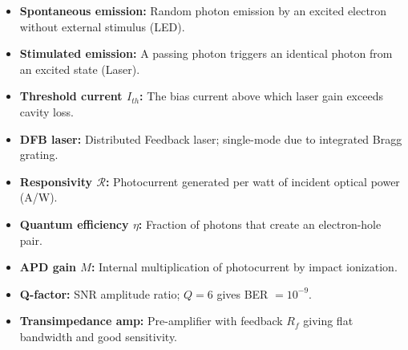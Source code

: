 \documentclass[12pt,a4paper]{article}
\begin{document}
\begin{tcolorbox}[defbox, title={\textbf{One-Line Definitions}}]
\begin{itemize}[leftmargin=*, itemsep=2pt, topsep=0pt]
  \item \textbf{Spontaneous emission:} Random photon emission by an excited electron without external stimulus (LED).
  \item \textbf{Stimulated emission:} A passing photon triggers an identical photon from an excited state (Laser).
  \item \textbf{Threshold current $I_{th}$:} The bias current above which laser gain exceeds cavity loss.
  \item \textbf{DFB laser:} Distributed Feedback laser; single-mode due to integrated Bragg grating.
  \item \textbf{Responsivity $\mathcal{R}$:} Photocurrent generated per watt of incident optical power (A/W).
  \item \textbf{Quantum efficiency $\eta$:} Fraction of photons that create an electron-hole pair.
  \item \textbf{APD gain $M$:} Internal multiplication of photocurrent by impact ionization.
  \item \textbf{Q-factor:} SNR amplitude ratio; $Q = 6$ gives BER $= 10^{-9}$.
  \item \textbf{Transimpedance amp:} Pre-amplifier with feedback $R_f$ giving flat bandwidth and good sensitivity.
\end{itemize}
\end{tcolorbox}
\end{document}
